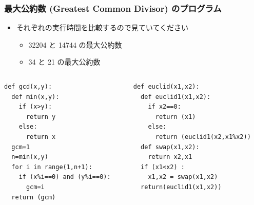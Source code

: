 \begin{frame}
\frametitle{最大公約数 (Greatest Common Divisor) のプログラム}
  \begin{itemize}
\item それぞれの実行時間を比較するので見ていてください
    \begin{itemize}
\item 32204 と 14744 の最大公約数
\item 34 と 21 の最大公約数
    \end{itemize}
  \end{itemize}
  \begin{columns}[t]
    \begin{column}{0.45\textwidth}
      \begin{lstlisting}[caption={gcd.py}]
def gcd(x,y):
  def min(x,y):
    if (x>y):
      return y
    else:
      return x
  gcm=1
  n=min(x,y)
  for i in range(1,n+1):
    if (x%i==0) and (y%i==0):
      gcm=i
  return (gcm)
      \end{lstlisting}
    \end{column}
    \begin{column}{0.45\textwidth}
      \begin{lstlisting}[caption={gcd.py},label=lst:euclid]
def euclid(x1,x2):
  def euclid1(x1,x2):
    if x2==0:
      return (x1)
    else:
      return (euclid1(x2,x1%x2))
  def swap(x1,x2):
    return x2,x1
  if (x1<x2) :
    x1,x2 = swap(x1,x2)
  return(euclid1(x1,x2))
      \end{lstlisting}
    \end{column}
  \end{columns}
\end{frame}
